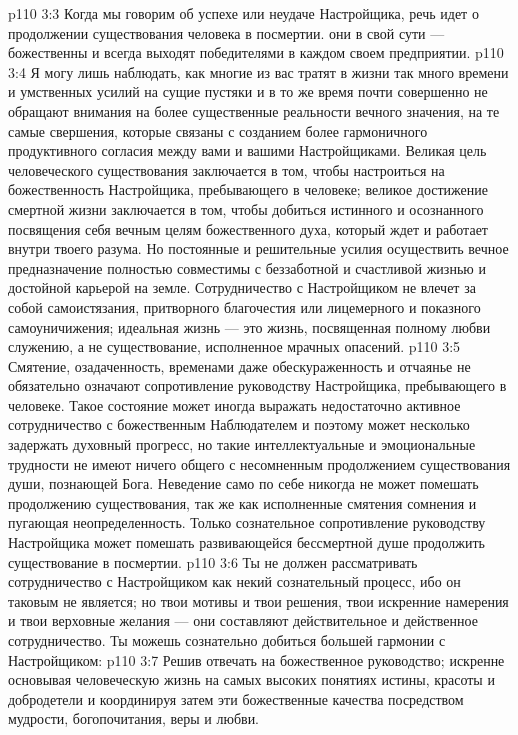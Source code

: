 \vs p110 3:3 Когда мы говорим об успехе или неудаче Настройщика, речь идет о продолжении существования человека в посмертии.  они в свой сути --- божественны и всегда выходят победителями в каждом своем предприятии.
\vs p110 3:4 \pc Я могу лишь наблюдать, как многие из вас тратят в жизни так много времени и умственных усилий на сущие пустяки и в то же время почти совершенно не обращают внимания на более существенные реальности вечного значения, на те самые свершения, которые связаны с созданием более гармоничного продуктивного согласия между вами и вашими Настройщиками. Великая цель человеческого существования заключается в том, чтобы настроиться на божественность Настройщика, пребывающего в человеке; великое достижение смертной жизни заключается в том, чтобы добиться истинного и осознанного посвящения себя вечным целям божественного духа, который ждет и работает внутри твоего разума. Но постоянные и решительные усилия осуществить вечное предназначение полностью совместимы с беззаботной и счастливой жизнью и достойной карьерой на земле. Сотрудничество с Настройщиком не влечет за собой самоистязания, притворного благочестия или лицемерного и показного самоуничижения; идеальная жизнь --- это жизнь, посвященная полному любви служению, а не существование, исполненное мрачных опасений.
\vs p110 3:5 \pc Смятение, озадаченность, временами даже обескураженность и отчаянье не обязательно означают сопротивление руководству Настройщика, пребывающего в человеке. Такое состояние может иногда выражать недостаточно активное сотрудничество с божественным Наблюдателем и поэтому может несколько задержать духовный прогресс, но такие интеллектуальные и эмоциональные трудности не имеют ничего общего с несомненным продолжением существования души, познающей Бога. Неведение само по себе никогда не может помешать продолжению существования, так же как исполненные смятения сомнения и пугающая неопределенность. Только сознательное сопротивление руководству Настройщика может помешать развивающейся бессмертной душе продолжить существование в посмертии.
\vs p110 3:6 Ты не должен рассматривать сотрудничество с Настройщиком как некий сознательный процесс, ибо он таковым не является; но твои мотивы и твои решения, твои искренние намерения и твои верховные желания --- они составляют действительное и действенное сотрудничество. Ты можешь сознательно добиться большей гармонии с Настройщиком:
\vs p110 3:7 \bibnobreakspace Решив отвечать на божественное руководство; искренне основывая человеческую жизнь на самых высоких понятиях истины, красоты и добродетели и координируя затем эти божественные качества посредством мудрости, богопочитания, веры и любви.
